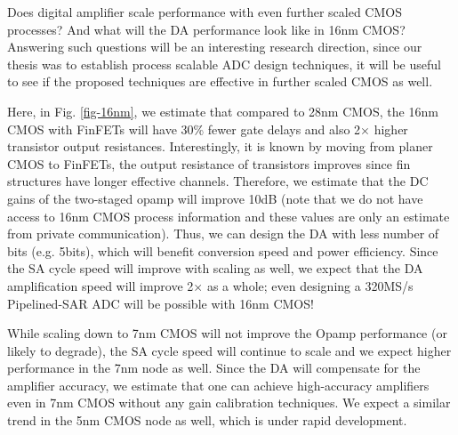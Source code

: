 Does digital amplifier scale performance with even further scaled CMOS processes? And what will the DA performance look like in 16nm CMOS? 
Answering such questions will be an interesting research direction, since our thesis was to establish process scalable ADC design techniques, it will be useful to see if the proposed techniques are effective in further scaled CMOS as well.

Here, in Fig. \ref{fig-16nm}, we estimate that compared to 28nm CMOS, the 16nm CMOS with FinFETs will have 30\% fewer gate delays and also 2$\times$ higher transistor output resistances.
Interestingly, it is known by moving from planer CMOS to FinFETs, the output resistance of transistors improves since fin structures have longer effective channels.
Therefore, we estimate that the DC gains of the two-staged opamp will improve 10dB (note that we do not have access to 16nm CMOS process information and these values are only an estimate from private communication).
Thus, we can design the DA with less number of bits (e.g. 5bits), which will benefit conversion speed and power efficiency. 
Since the SA cycle speed will improve with scaling as well, we expect that the DA amplification speed will improve 2$\times$ as a whole; even designing a 320MS/s Pipelined-SAR ADC will be possible with 16nm CMOS!

While scaling down to 7nm CMOS will not improve the Opamp performance (or likely to degrade), the SA cycle speed will continue to scale and we expect higher performance in the 7nm node as well.
Since the DA will compensate for the amplifier accuracy, we estimate that one can achieve high-accuracy amplifiers even in 7nm CMOS without any gain calibration techniques. We expect a similar trend in the 5nm CMOS node as well, which is under rapid development.

